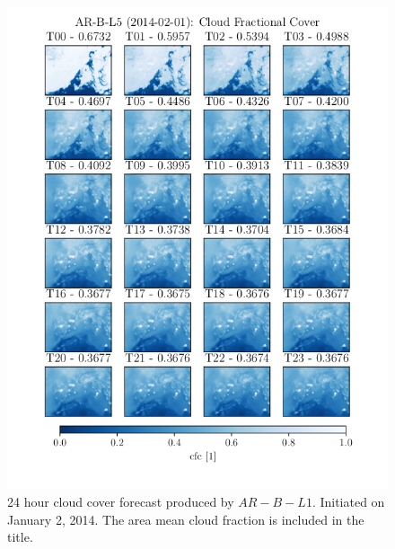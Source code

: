 \begin{figure}[ht]
    \centering
    \includegraphics{python_figs/AR-B-L5_timelapse_cloud_cover_24hrs_from_2014_02_01.png}
    \caption{24 hour cloud cover forecast produced by $AR-B-L1$.  Initiated on January 2, 2014. The area mean cloud fraction is included in the title.}
    \label{fig:timelapse_ar}
\end{figure}
